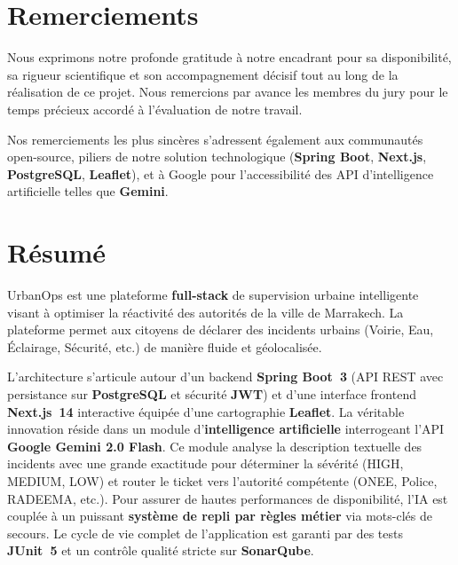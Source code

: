 \documentclass[12pt,a4paper,oneside]{book} %
\begin{document}
\chapter*{Remerciements}
\begin{center}
\begin{minipage}{0.88\textwidth}
\justifying
Nous exprimons notre profonde gratitude à notre encadrant pour sa disponibilité, sa rigueur scientifique et son accompagnement décisif tout au long de la réalisation de ce projet. Nous remercions par avance les membres du jury pour le temps précieux accordé à l'évaluation de notre travail.

Nos remerciements les plus sincères s'adressent également aux communautés open-source, piliers de notre solution technologique (\textbf{Spring Boot}, \textbf{Next.js}, \textbf{PostgreSQL}, \textbf{Leaflet}), et à Google pour l'accessibilité des API d'intelligence artificielle telles que \textbf{Gemini}.
\end{minipage}
\end{center}

\clearpage

\chapter*{Résumé}
\thispagestyle{plain}
\begin{resumebox}
\justifying
UrbanOps est une plateforme \textbf{full-stack} de supervision urbaine intelligente visant à optimiser la réactivité des autorités de la ville de Marrakech. La plateforme permet aux citoyens de déclarer des incidents urbains (Voirie, Eau, Éclairage, Sécurité, etc.) de manière fluide et géolocalisée. 

L'architecture s'articule autour d'un backend \textbf{Spring Boot~3} (API REST avec persistance sur \textbf{PostgreSQL} et sécurité \textbf{JWT}) et d'une interface frontend \textbf{Next.js~14} interactive équipée d'une cartographie \textbf{Leaflet}. La véritable innovation réside dans un module d'\textbf{intelligence artificielle} interrogeant l'API \textbf{Google Gemini 2.0 Flash}. Ce module analyse la description textuelle des incidents avec une grande exactitude pour déterminer la sévérité (HIGH, MEDIUM, LOW) et router le ticket vers l'autorité compétente (ONEE, Police, RADEEMA, etc.). Pour assurer de hautes performances de disponibilité, l'IA est couplée à un puissant \textbf{système de repli par règles métier} via mots-clés de secours. Le cycle de vie complet de l'application est garanti par des tests \textbf{JUnit~5} et un contrôle qualité stricte sur \textbf{SonarQube}.
\end{resumebox}
\end{document}
